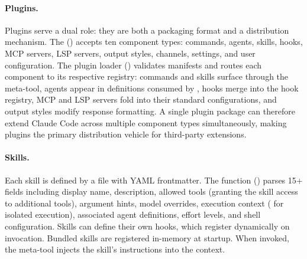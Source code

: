 \paragraph{Plugins.}
Plugins serve a dual role: they are both a packaging format and a distribution mechanism. The  () accepts ten component types: commands, agents, skills, hooks, MCP servers, LSP servers, output styles, channels, settings, and user configuration. The plugin loader () validates manifests and routes each component to its respective registry: commands and skills surface through the  meta-tool, agents appear in definitions consumed by , hooks merge into the hook registry, MCP and LSP servers fold into their standard configurations, and output styles modify response formatting. A single plugin package can therefore extend Claude Code across multiple component types simultaneously, making plugins the primary distribution vehicle for third-party extensions.

\paragraph{Skills.}
Each skill is defined by a  file with YAML frontmatter. The  function () parses 15+ fields including display name, description, allowed tools (granting the skill access to additional tools), argument hints, model overrides, execution context ( for isolated execution), associated agent definitions, effort levels, and shell configuration. Skills can define their own hooks, which register dynamically on invocation. Bundled skills are registered in-memory at startup. When invoked, the  meta-tool injects the skill's instructions into the context.

